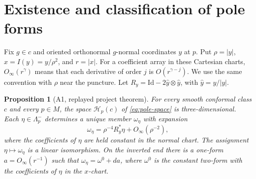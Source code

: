 \documentclass[11pt,letterpaper]{article}
\numberwithin{equation}{section}
\newtheorem{proposition}{Proposition}[section]
\begin{document}
\section{Existence and classification of pole forms}\label{sec:pole-existence}

Fix \(g\in c\) and oriented orthonormal \(g\)-normal coordinates \(y\) at
\(p\). Put \(\rho=|y|\), \(x=I(y)=y/\rho^2\), and \(r=|x|\).
For a coefficient array in these Cartesian charts,
\(O_\infty(r^\gamma)\) means that each derivative of order \(j\) is
\(O(r^{\gamma-j})\). We use the same convention with \(\rho\) near
the puncture. Let \(R_y=\mathrm{Id}-2\hat y\otimes\hat y\), with
\(\hat y=y/|y|\).

\begin{proposition}[A1, replayed project theorem]\label{prop:pole}
For every smooth conformal class \(c\) and every \(p\in M\), the space
\(\mathcal H_p(c)\) of \eqref{eq:pole-space} is three-dimensional.
Each \(\eta\in\Lambda_p^-\) determines a unique member \(\omega_\eta\)
with expansion
\[
 \omega_\eta=\rho^{-4}R_y^*\eta+O_\infty(\rho^{-2}),
\]
where the coefficients of \(\eta\) are held constant in the normal
chart. The assignment \(\eta\mapsto\omega_\eta\) is a linear
isomorphism. On the inverted end there is a one-form
\(a=O_\infty(r^{-1})\) such that \(\omega_\eta=\omega^0+da\), where
\(\omega^0\) is the constant two-form with the coefficients of \(\eta\)
in the \(x\)-chart.
\end{proposition}
\end{document}
